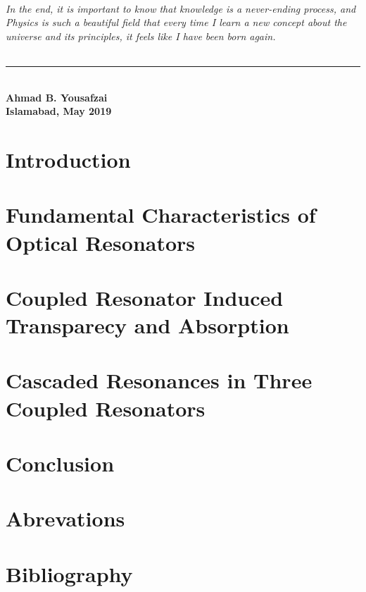 \documentclass[12pt,twoside]{report}
\begin{document}
\subparagraph*{ \normalfont	In the end, it is important to know that knowledge is a never-ending process, and Physics is such a beautiful field that every time I learn a new concept about the universe and its principles, it feels like I have been born again.} 
\begin{flushleft}
\noindent\rule{5cm}{0.5pt}\\
\textbf{\small Ahmad B. Yousafzai}\\
\textbf{\small Islamabad, May 2019}
\end{flushleft}


\begin{scriptsize}
\small \tableofcontents
\end{scriptsize}
\small \listoffigures
\newpage
{}
\fancyhead[RO,LE]{}
\fancyfoot[LE,RO]{\thepage}
\renewcommand{\footrulewidth}{0.5pt}

\pagestyle{fancy}

\chapter{Introduction}

 
\chapter{Fundamental Characteristics of Optical Resonators}

 
\chapter{Coupled Resonator Induced Transparecy and Absorption}

 
\chapter{Cascaded Resonances in Three Coupled Resonators}


\chapter{Conclusion}

\appendix
\chapter{Abrevations}


\chapter{Bibliography}

\end{document}

